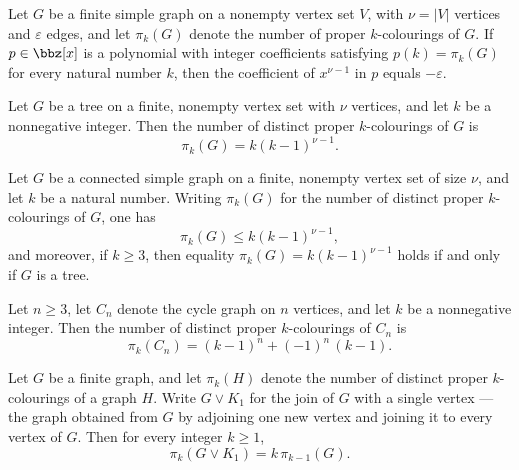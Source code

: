 \begin{theorem}
\label{SimpleGraph.chromaticPolynomial_coeff_card_sub_one}
\leanok
{}
Let $G$ be a finite simple graph on a nonempty vertex set $V$, with $\nu = |V|$ vertices
and $\varepsilon$ edges, and let $\pi_k(G)$ denote the number of proper $k$-colourings
of $G$. If $p \in \bbz[x]$ is a polynomial with integer coefficients satisfying $p(k) =
\pi_k(G)$ for every natural number $k$, then the coefficient of $x^{\nu - 1}$ in $p$
equals $-\varepsilon$.
\end{theorem}

\begin{theorem}
\label{SimpleGraph.numColorings_of_isTree}
\leanok
{}
Let $G$ be a tree on a finite, nonempty vertex set with $\nu$ vertices, and let $k$ be a
nonnegative integer. Then the number of distinct proper $k$-colourings of $G$ is
\[\pi_k(G) = k(k-1)^{\nu-1}.\]
\end{theorem}

\begin{theorem}
\label{SimpleGraph.numColorings_le_of_connected}
\leanok
{}
Let $G$ be a connected simple graph on a finite, nonempty vertex set of size $\nu$, and
let $k$ be a natural number. Writing $\pi_k(G)$ for the number of distinct proper
$k$-colourings of $G$, one has
\[ \pi_k(G) \le k(k-1)^{\nu-1}, \]
and moreover, if $k \ge 3$, then equality $\pi_k(G) = k(k-1)^{\nu-1}$ holds if and only
if $G$ is a tree.
\end{theorem}

\begin{theorem}
\label{SimpleGraph.numColorings_cycleGraph}
\leanok
{}
Let $n \ge 3$, let $C_n$ denote the cycle graph on $n$ vertices, and let $k$ be a
nonnegative integer. Then the number of distinct proper $k$-colourings of $C_n$ is
\[
\pi_k(C_n) = (k-1)^n + (-1)^n\,(k-1).
\]
\end{theorem}

\begin{theorem}
\label{SimpleGraph.numColorings_join_singleton}
\leanok
{}
Let $G$ be a finite graph, and let $\pi_k(H)$ denote the number of distinct proper
$k$-colourings of a graph $H$. Write $G \vee K_1$ for the join of $G$ with a single
vertex — the graph obtained from $G$ by adjoining one new vertex and joining it to every
vertex of $G$. Then for every integer $k \ge 1$,
\[
  \pi_k(G \vee K_1) = k\,\pi_{k-1}(G).
\]
\end{theorem}


